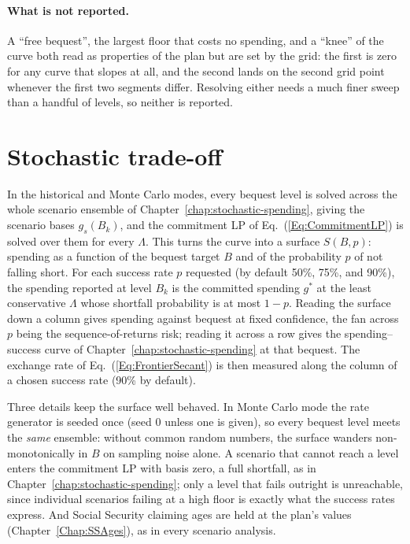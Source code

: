 \documentclass[fleqn,12pt]{report}
\begin{document}
\paragraph*{What is not reported.}
A ``free bequest'', the largest floor that costs no spending, and a ``knee'' of the curve both read
as properties of the plan but are set by the grid: the first is zero for any curve that slopes at
all, and the second lands on the second grid point whenever the first two segments differ.
Resolving either needs a much finer sweep than a handful of levels, so neither is reported.

\section{Stochastic trade-off}
\label{sec:frontier-stochastic}

In the historical and Monte Carlo modes, every bequest level is solved across the whole scenario
ensemble of Chapter~\ref{chap:stochastic-spending}, giving the scenario bases $g_s(B_k)$, and the
commitment LP of Eq.~(\ref{Eq:CommitmentLP}) is solved over them for every $\Lambda$.
This turns the curve into a surface $S(B, p)$: spending as a function of the bequest target $B$ and
of the probability $p$ of not falling short.
For each success rate $p$ requested (by default 50\%, 75\%, and 90\%), the spending reported at
level $B_k$ is the committed spending $g^*$ at the least conservative $\Lambda$ whose shortfall
probability is at most $1 - p$.
Reading the surface down a column gives spending against bequest at fixed confidence, the fan
across $p$ being the sequence-of-returns risk; reading it across a row gives the spending--success
curve of Chapter~\ref{chap:stochastic-spending} at that bequest.
The exchange rate of Eq.~(\ref{Eq:FrontierSecant}) is then measured along the column of a chosen
success rate (90\% by default).

Three details keep the surface well behaved.
In Monte Carlo mode the rate generator is seeded once (seed 0 unless one is given), so every
bequest level meets the \emph{same} ensemble: without common random numbers, the surface wanders
non-monotonically in $B$ on sampling noise alone.
A scenario that cannot reach a level enters the commitment LP with basis zero, a full shortfall,
as in Chapter~\ref{chap:stochastic-spending}; only a level that fails outright is unreachable,
since individual scenarios failing at a high floor is exactly what the success rates express.
And Social Security claiming ages are held at the plan's values (Chapter~\ref{Chap:SSAges}),
as in every scenario analysis.
\end{document}
